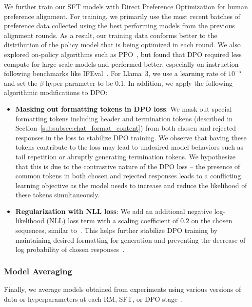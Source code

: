 We further train our SFT models with Direct Preference Optimization \citep[DPO;][]{rafailov2024direct} for human preference alignment. For training, we primarily use the most recent batches of preference data collected using the best performing models from the previous alignment rounds. As a result, our training data conforms better to the distribution of the policy model that is being optimized in each round. We also explored on-policy algorithms such as PPO~\citep{schulman2017proximal}, but found that DPO required less compute for large-scale models and performed better, especially on instruction following benchmarks like IFEval~\citep{zhou2023instruction}. For Llama~3, we use a learning rate of $10^{-5}$ and set the $\beta$ hyper-parameter to be 0.1. In addition, we apply the following algorithmic modifications to DPO:

\begin{itemize}
    \item \textbf{Masking out formatting tokens in DPO loss}: We mask out special formatting tokens including header and termination tokens (described in Section~\ref{subsubsec:chat_format_content}) from both chosen and rejected responses in the loss to stabilize DPO training. We observe that having these tokens contribute to the loss may lead to undesired model behaviors such as tail repetition or abruptly generating termination tokens. We hypothesize that this is due to the contrastive nature of the DPO loss -- the presence of common tokens in both chosen and rejected responses leads to a conflicting learning objective as the model needs to increase and reduce the likelihood of these tokens simultaneously. 
    \item \textbf{Regularization with NLL loss}: We add an additional negative log-likelihood (NLL)  loss term with a scaling coefficient of $0.2$ on the chosen sequences, similar to~\citet{pang2024iterative}. This helps further stabilize DPO training by maintaining desired formatting for generation and preventing the decrease of log probability of chosen responses~\citep{pang2024iterative, pal2024smaug}. 
\end{itemize}

\subsubsection{Model Averaging}

Finally, we average models obtained from experiments using various versions of data or hyperparameters at each RM, SFT, or DPO stage~\citep{izmailov2019averagingweightsleadswider,wortsman2022modelsoupsaveragingweights, li2022branchtrainmergeembarrassinglyparalleltraining}. 

